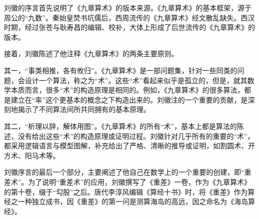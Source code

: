 \documentclass[a4paper,12pt,UTF8,twoside]{ctexbook}
\begin{document}
刘徽的序言首先说明了《九章算术》的版本来源。《九章算术》的基本框架，源于周公的“九数”。秦始皇焚书坑儒后，西周流传的《九章算术》经文散乱缺失。西汉时期，经过张苍与耿寿昌的编辑、校补，大体上形成了后世流传的《九章算术》的版本。

接着，刘徽陈述了他注释《九章算术》的两条主要原则。

其一，“事类相推，各有攸归”。《九章算术》是一部问题集，针对一些同类的问题，会设计一个算法，称之为“术”。这些“术”看起来似乎是孤立的，但是，就其数学本质而言，很多“术”的构造原理是相同的。例如，《九章算术》的很多算法，都是建立在“率”这个更基本的概念之下构造出来的。刘徽注的一个重要的贡献，是深刻地揭示了不同算法间所共同拥有的基本原理。

其二，“析理以辞，解体用图”。《九章算术》的所有“术”，基本上都是算法的陈述，没有给出这些“术”的构造原理或证明过程。刘徽针对几乎所有的重要的“术”，都采用逻辑语言与模型图解，补充给出了严格、清晰的推导或证明，如割圆术、开方术、阳马术等。

刘徽序言的最后一个部分，主要阐述了他自己在数学上的一个重要的创建，即“重差术”。为了说明“重差术”的应用，刘徽撰写了《重差》一卷，作为《九章算术》的第十卷，缀于“勾股”之后。唐代李淳风编辑《算经十书》时，将《重差》作为算经之一种独立成书，因《重差》的第一问是测算海岛的高远，因之命名为《海岛算经》。
\end{document}
